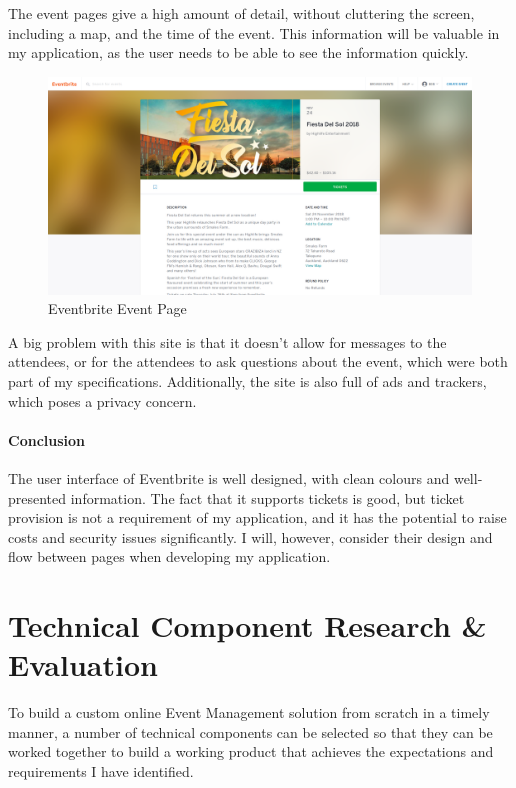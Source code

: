 \documentclass[a4paper,oneside,12pt]{report}
\begin{document}
	The event pages give a high amount of detail, without cluttering the screen, including a map, and the time of the event. This information will be valuable in my application, as the user needs to be able to see the information quickly.

	\begin{figure}[H]
		\caption{Eventbrite Event Page}
		\includegraphics[width=\linewidth]{static/eventbrite-event.png}
	\end{figure}

	A big problem with this site is that it doesn't allow for messages to the attendees, or for the attendees to ask questions about the event, which were both part of my specifications. Additionally, the site is also full of ads and trackers, which poses a privacy concern.

	\subsubsection{Conclusion}
	The user interface of Eventbrite is well designed, with clean colours and well-presented information. The fact that it supports tickets is good, but ticket provision is not a requirement of my application, and it has the potential to raise costs and security issues significantly. I will, however, consider their design and flow between pages when developing my application.

	\chapter{Technical Component Research \& Evaluation}
	To build a custom online Event Management solution from scratch in a timely manner, a number of technical components can be selected so that they can be worked together to build a working product that achieves the expectations and requirements I have identified.
	
\end{document}
